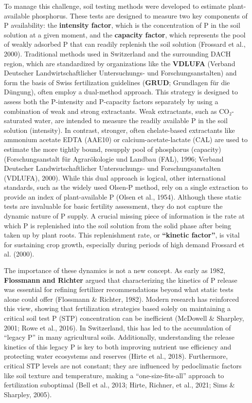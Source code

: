 \documentclass[
  a4paper,
]{article}
\begin{document}
To manage this challenge, soil testing methods were developed to
estimate plant-available phosphorus. These tests are designed to measure
two key components of P availability: the \textbf{intensity factor},
which is the concentration of P in the soil solution at a given moment,
and the \textbf{capacity factor}, which represents the pool of weakly
adsorbed P that can readily replenish the soil solution (Frossard et
al., 2000). Traditional methods used in Switzerland and the surrounding
DACH region, which are standardized by organizations like the
\textbf{VDLUFA} (Verband Deutscher Landwirtschaftlicher Untersuchungs-
und Forschungsanstalten) and form the basis of Swiss fertilization
guidelines (\textbf{GRUD}; Grundlagen für die Düngung), often employ a
dual-method approach. This strategy is designed to assess both the
P-intensity and P-capacity factors separately by using a combination of
weak and strong extractants. Weak extractants, such as CO₂-saturated
water, are intended to measure the readily available P in the soil
solution (intensity). In contrast, stronger, often chelate-based
extractants like ammonium acetate EDTA (AAE10) or
calcium-acetate-lactate (CAL) are used to estimate the more tightly
bound, resupply pool of phosphorus (capacity) (Forschungsanstalt für
Agrarökologie und Landbau (FAL), 1996; Verband Deutscher
Landwirtschaftlicher Untersuchungs- und Forschungsanstalten (VDLUFA),
2000). While this dual approach is logical, other international
standards, such as the widely used Olsen-P method, rely on a single
extraction to provide an index of plant-available P (Olsen et al.,
1954). Although these static tests are invaluable for basic fertility
assessment, they do not capture the dynamic nature of P supply. A
crucial missing piece of information is the rate at which P is
replenished into the soil solution from the solid phase after being
taken up by plant roots. This replenishment rate, or \textbf{``kinetic
factor''}, is vital for sustaining crop growth, especially during
periods of high demand Frossard et al. (2000).

The importance of these dynamics is not a new concept. As early as 1982,
\textbf{Flossmann and Richter} argued that characterizing the kinetics
of P release was essential for refining fertilizer recommendations
beyond what static tests alone could offer (Flossmann \& Richter, 1982).
Modern research has reinforced this view, showing that fertilization
strategies based solely on maintaining a critical soil test P (STP)
concentration can be inefficient (McDowell \& Sharpley, 2001; Rowe et
al., 2016). In Switzerland, this has led to the accumulation of ``legacy
P'' in many agricultural soils. Additionally, understanding the release
kinetics of this legacy P is key to both improving nutrient use
efficiency and protecting water ecosystems and reserves (Hirte et al.,
2018). Furthermore, critical STP levels are not constant; they are
influenced by pedoclimatic factors like soil texture and temperature,
making a ``one-size-fits-all'' approach to fertilization suboptimal
(Bell et al., 2013; Hirte, Richner, et al., 2021; Sims \& Sharpley,
2005).
\end{document}
